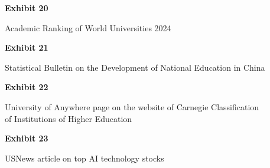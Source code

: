 \documentclass{article}
\begin{document}
\vspace*{\fill}
\begin{center}
{\LARGE \bf
Exhibit 20
}

\vspace{10\baselineskip}

{\large Academic Ranking of World Universities 2024}

\end{center}
\vspace*{\fill}

 

\vspace*{\fill}
\begin{center}
{\LARGE \bf
Exhibit 21
}

\vspace{10\baselineskip}

{\large Statistical Bulletin on the Development of National Education in China}

\end{center}
\vspace*{\fill}




\vspace*{\fill}
\begin{center}
{\LARGE \bf
Exhibit 22
}

\vspace{10\baselineskip}

{\large University of Anywhere page on the website of Carnegie Classification\\ of Institutions of Higher Education}

\end{center}
\vspace*{\fill}


% 



\vspace*{\fill}
\begin{center}
{\LARGE \bf
Exhibit 23
}

\vspace{10\baselineskip}

{\large USNews article on top AI technology stocks}

\end{center}
\vspace*{\fill}
\end{document}
